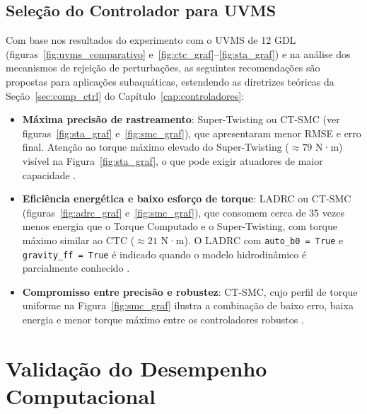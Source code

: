 \subsection{Seleção do Controlador para UVMS}

Com base nos resultados do experimento com o UVMS de 12 GDL (figuras~\ref{fig:uvms_comparativo} e~\ref{fig:ctc_graf}--\ref{fig:sta_graf}) e na análise dos mecanismos de rejeição de perturbações, as seguintes recomendações são propostas para aplicações subaquáticas, estendendo as diretrizes teóricas da Seção~\ref{sec:comp_ctrl} do Capítulo~\ref{cap:controladores}:

\begin{itemize}
    \item \textbf{Máxima precisão de rastreamento}: Super-Twisting ou CT-SMC (ver figuras~\ref{fig:sta_graf} e~\ref{fig:smc_graf}), que apresentaram menor RMSE e erro final. Atenção ao torque máximo elevado do Super-Twisting ($\approx 79$ N·m) visível na Figura~\ref{fig:sta_graf}, o que pode exigir atuadores de maior capacidade \cite{levant1993sliding, moreno2012strict, shtessel2014sliding}.

    \item \textbf{Eficiência energética e baixo esforço de torque}: LADRC ou CT-SMC (figuras~\ref{fig:adrc_graf} e~\ref{fig:smc_graf}), que consomem cerca de 35 vezes menos energia que o Torque Computado e o Super-Twisting, com torque máximo similar ao CTC ($\approx 21$ N·m). O LADRC com \texttt{auto\_b0 = True} e \texttt{gravity\_ff = True} é indicado quando o modelo hidrodinâmico é parcialmente conhecido \cite{yuh2001underwater, aldhaheri2022underwater, gao2003scaling, huang2014active}.

    \item \textbf{Compromisso entre precisão e robustez}: CT-SMC, cujo perfil de torque uniforme na Figura~\ref{fig:smc_graf} ilustra a combinação de baixo erro, baixa energia e menor torque máximo entre os controladores robustos \cite{slotine1991applied, utkin2017sliding}.
\end{itemize}

\section{Validação do Desempenho Computacional}
\label{sec:desempenho_computacional}

